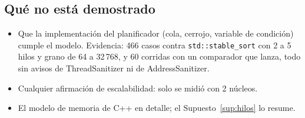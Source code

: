 \subsection{Qué no está demostrado}
\begin{itemize}[nosep]
\item Que la implementación del planificador (cola, cerrojo, variable de condición)
  cumple el modelo. Evidencia: 466 casos contra \texttt{std::stable\_sort} con 2 a 5
  hilos y grano de 64 a 32\,768, y 60 corridas con un comparador que lanza, todo sin
  avisos de ThreadSanitizer ni de AddressSanitizer.
\item Cualquier afirmación de escalabilidad: solo se midió con 2 núcleos.
\item El modelo de memoria de C++ en detalle; el Supuesto~\ref{sup:hilos} lo resume.
\end{itemize}
